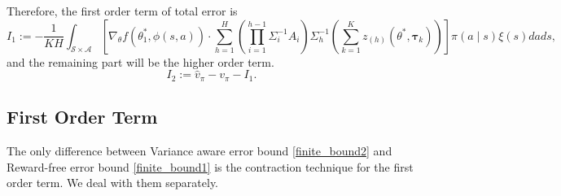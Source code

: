 \documentclass{article}
\numberwithin{equation}{section}
\theoremstyle{plain}
\theoremstyle{definition}
\theoremstyle{remark}
\begin{document}
Therefore, the first order term of total error is
\begin{equation}
    I_1 := - \frac{1}{KH} \int_{\mathcal{S} \times \mathcal{A}} \left[\nabla_{\theta} f(\theta_1^*,\phi(s,a)) \cdot \sum_{h=1}^H \left(\prod_{i=1}^{h-1} \Sigma_{i}^{-1} A_i\right) \Sigma^{-1}_h \left(\sum_{k=1}^K z_{(h)}(\theta^*,\boldsymbol{\tau}_k)\right) \right] \pi(a \mid s)\xi(s) d a d s,
\end{equation}
and the remaining part will be the higher order term.
\begin{equation}
    I_2 := \widehat{v}_{\pi} - v_{\pi} - I_1.
\end{equation}

\subsection{First Order Term}\label{sec:pf_first_order}
The only difference between Variance aware error bound \eqref{finite_bound2} and Reward-free error bound \eqref{finite_bound1} is the contraction technique for the first order term. We deal with them separately.
\end{document}
